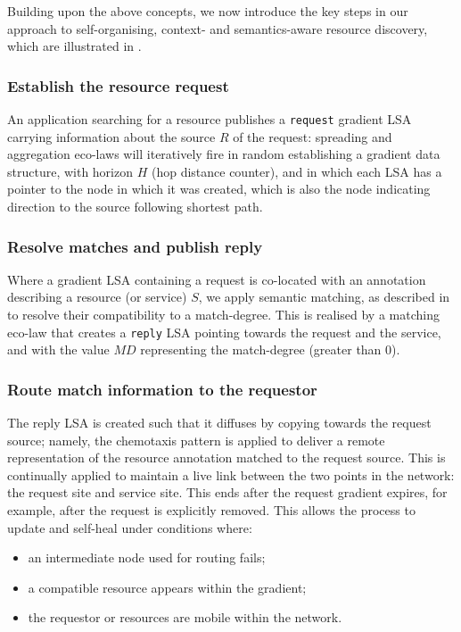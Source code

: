 \documentclass[12pt,a4paper,twoside,openright]{book}
\begin{document}
Building upon the above concepts, we now introduce the key steps in our approach to self-organising, context- and semantics-aware resource discovery, which are illustrated in .

\subsubsection{Establish the resource request}
An application searching for a resource publishes a \texttt{request} gradient LSA carrying information about the source $R$ of the request: spreading and aggregation eco-laws will iteratively fire in random establishing a gradient data structure, with horizon $H$ (hop distance counter), and  in which each LSA has a pointer to the node in which it was created, which is also the node indicating direction to the source following shortest path.

\subsubsection{Resolve matches and publish reply}
Where a gradient LSA containing a request is co-located with an annotation describing a resource (or service) $S$, we apply semantic matching, as described in  to resolve their compatibility to a match-degree.
%
This is realised by a matching eco-law that creates a \texttt{reply} LSA pointing towards the request and the service, and with the value $MD$ representing the match-degree (greater than $0$). 

\subsubsection{Route match information to the requestor}
The reply LSA is created such that it diffuses by copying towards the request source; namely, the chemotaxis pattern is applied to deliver a remote representation of the resource annotation matched to the request source. This is continually applied to maintain a live link between the two points in the network: the request site and service site.
%
This ends after the request gradient expires, for example, after the request is explicitly removed.
%
This allows the process to update and self-heal under conditions where:
\begin{itemize}
 \item an intermediate node used for routing fails;
 \item a compatible resource appears within the gradient;
 \item the requestor or resources are mobile within the network.
\end{itemize}
\end{document}
